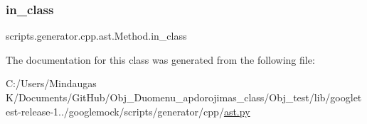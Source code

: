 \subsubsection{\texorpdfstring{in\_class}{in\_class}}
{\footnotesize\ttfamily scripts.\+generator.\+cpp.\+ast.\+Method.\+in\+\_\+class}



The documentation for this class was generated from the following file\+:\begin{DoxyCompactItemize}
\item 
C\+:/\+Users/\+Mindaugas K/\+Documents/\+Git\+Hub/\+Obj\+\_\+\+Duomenu\+\_\+apdorojimas\+\_\+class/\+Obj\+\_\+test/lib/googletest-\/release-\/1../googlemock/scripts/generator/cpp/\mbox{\hyperlink{_obj__test_2lib_2googletest-release-1_88_81_2googlemock_2scripts_2generator_2cpp_2ast_8py}{ast.\+py}}\end{DoxyCompactItemize}
